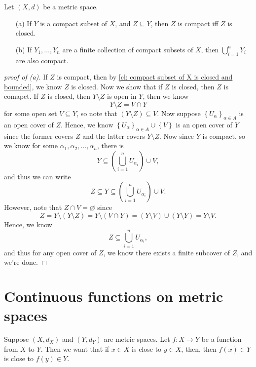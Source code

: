\begin{theorem}
    Let \((X, d)\) be a metric space. 
    \begin{itemize}
        \item [(a)] If \(Y\) is a compact subset of \(X\), and \(Z \subseteq Y\), then \(Z\) is compact iff \(Z\) is closed.      
        \item [(b)] If \(Y_1, \dots , Y_n\) are a finite collection of compact subsets of \(X\), then \(\bigcup_{i=1}^{n} Y_i \) are also compact.   
    \end{itemize} 
\end{theorem}
\begin{proof}[proof of (a)]
    If \(Z\) is compact, then by \autoref{cl: compact subset of X is closed and bounded}, we know \(Z\) is closed. Now we show that if \(Z\) is closed, then \(Z\) is comapct. If \(Z\) is closed, then \(Y \setminus Z\) is open in \(Y\), then we know 
    \[
        Y \setminus Z = V \cap Y
    \] for some open set \(V \subseteq Y\), so note that \((Y \setminus Z) \subseteq V\). Now suppose \(\left\{ U_\alpha  \right\}_{\alpha \in A} \) is an open cover of \(Z\). Hence, we know \(\left\{ U_\alpha  \right\}_{\alpha \in A} \cup \left\{ V \right\}  \) is an open cover of \(Y\) since the former covers \(Z\) and the latter covers \(Y \setminus Z\). Now since \(Y\) is compact, so we know for some \(\alpha _1, \alpha _2, \dots , \alpha _n\), there is 
    \[
        Y \subseteq \left( \bigcup_{i=1}^{n} U_{\alpha _i} \right) \cup V, 
    \] and thus we can write
    \[
        Z \subseteq Y \subseteq \left( \bigcup_{i=1}^{n} U_{\alpha _i}  \right) \cup V. 
    \]  
    However, note that \(Z \cap V = \varnothing \) since
    \[
        Z = Y \setminus (Y \setminus Z) = Y \setminus (V \cap Y) = (Y \setminus V) \cup (Y \setminus Y) = Y \setminus V.
    \]
    Hence, we know 
    \[
        Z \subseteq \bigcup_{i=1}^{n} U_{\alpha _i}, 
    \] and thus for any open cover of \(Z\), we know there exists a finite subcover of \(Z\), and we're done.
\end{proof}










\chapter{Continuous functions on metric spaces}
Suppose \((X, d_X)\) and \((Y, d_Y)\) are metric spaces. Let \(f: X \to Y\) be a function from \(X\) to \(Y\). Then we want that if \(x \in X\) is close to \(y \in X\), then, then \(f(x)\in Y\) is close to \(f(y) \in Y\). 

